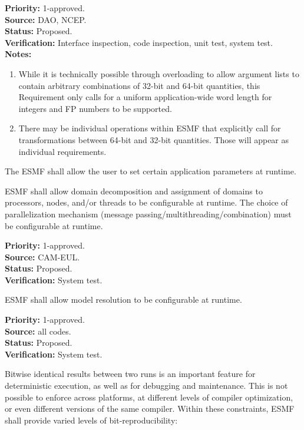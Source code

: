 \begin{reqlist}
  {\bf Priority:} 1-approved. \\
  {\bf Source:} DAO, NCEP. \\
  {\bf Status:} Proposed. \\
  {\bf Verification:} Interface inspection, code inspection, unit
  test, system test. \\
  {\bf Notes:}
  \begin{enumerate}
  \item While it is technically possible through overloading to allow
    argument lists to contain arbitrary combinations of 32-bit and
    64-bit quantities, this Requirement only calls for a uniform
    application-wide word length for integers and FP numbers to be
    supported.
  \item There may be individual operations within ESMF that explicitly
    call for transformations between 64-bit and 32-bit quantities.
    Those will appear as individual requirements.
  \end{enumerate}
\end{reqlist}

 The ESMF shall allow the user to set
certain application parameters at runtime.

 ESMF shall allow domain
decomposition and assignment of domains to processors, nodes, and/or
threads to be configurable at runtime.  The choice of parallelization
mechanism (message passing/multithreading/combination) must be
configurable at runtime.
\begin{reqlist}
{\bf Priority:} 1-approved. \\
{\bf Source:} CAM-EUL. \\
{\bf Status:} Proposed. \\
{\bf Verification:} System test.
\end{reqlist}

ESMF shall allow model resolution to be configurable at runtime.
\begin{reqlist}
{\bf Priority:} 1-approved. \\
{\bf Source:} all codes. \\
{\bf Status:} Proposed. \\
{\bf Verification:} System test.
\end{reqlist}


Bitwise identical results between two runs is an important feature for
deterministic execution, as well as for debugging and maintenance.
This is not possible to enforce across platforms, at different levels
of compiler optimization, or even different versions of the same
compiler. Within these constraints, ESMF shall provide varied levels
of bit-reproducibility:

